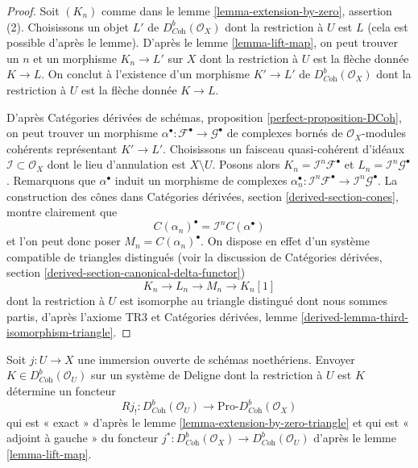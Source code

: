 \begin{proof}
Soit $(K_n)$ comme dans le lemme \ref{lemma-extension-by-zero}, assertion (2). Choisissons un objet $L'$ de $D^b_{\textit{Coh}}(\mathcal{O}_X)$ dont la restriction à $U$ est $L$ (cela est possible d'après le lemme). D'après le lemme \ref{lemma-lift-map}, on peut trouver un $n$ et un morphisme $K_n \to L'$ sur $X$ dont la restriction à $U$ est la flèche donnée $K \to L$. On conclut à l'existence d'un morphisme $K' \to L'$ de $D^b_{\textit{Coh}}(\mathcal{O}_X)$ dont la restriction à $U$ est la flèche donnée $K \to L$.

\medskip\noindent
D'après Catégories dérivées de schémas, proposition \ref{perfect-proposition-DCoh}, on peut trouver un morphisme $\alpha^\bullet : \mathcal{F}^\bullet \to
\mathcal{G}^\bullet$ de complexes bornés de $\mathcal{O}_X$-modules cohérents représentant $K' \to L'$. Choisissons un faisceau quasi-cohérent d'idéaux $\mathcal{I} \subset \mathcal{O}_X$ dont le lieu d'annulation est $X \setminus U$. Posons alors
$K_n = \mathcal{I}^n\mathcal{F}^\bullet$
et
$L_n = \mathcal{I}^n\mathcal{G}^\bullet$.
Remarquons que $\alpha^\bullet$ induit un morphisme de complexes $\alpha_n^\bullet : \mathcal{I}^n\mathcal{F}^\bullet \to
\mathcal{I}^n\mathcal{G}^\bullet$. La construction des cônes dans Catégories dérivées, section \ref{derived-section-cones}, montre clairement que
$$
C(\alpha_n)^\bullet = \mathcal{I}^nC(\alpha^\bullet)
$$
et l'on peut donc poser $M_n = C(\alpha_n)^\bullet$. On dispose en effet d'un système compatible de triangles distingués (voir la discussion de Catégories dérivées, section \ref{derived-section-canonical-delta-functor})
$$
K_n \to L_n \to M_n \to K_n[1]
$$
dont la restriction à $U$ est isomorphe au triangle distingué dont nous sommes partis, d'après l'axiome TR3 et Catégories dérivées, lemme \ref{derived-lemma-third-isomorphism-triangle}.
\end{proof}

\begin{remark}
\label{remark-extension-by-zero}
Soit $j : U \to X$ une immersion ouverte de schémas noethériens. Envoyer $K \in D^b_{\textit{Coh}}(\mathcal{O}_U)$ sur un système de Deligne dont la restriction à $U$ est $K$ détermine un foncteur
$$
Rj_! :
D^b_{\textit{Coh}}(\mathcal{O}_U)
\longrightarrow
\text{Pro-}D^b_{\textit{Coh}}(\mathcal{O}_X)
$$
qui est « exact » d'après le lemme \ref{lemma-extension-by-zero-triangle} et qui est « adjoint à gauche » du foncteur $j^* : D^b_{\textit{Coh}}(\mathcal{O}_X) \to
D^b_{\textit{Coh}}(\mathcal{O}_U)$ d'après le lemme \ref{lemma-lift-map}.
\end{remark}

